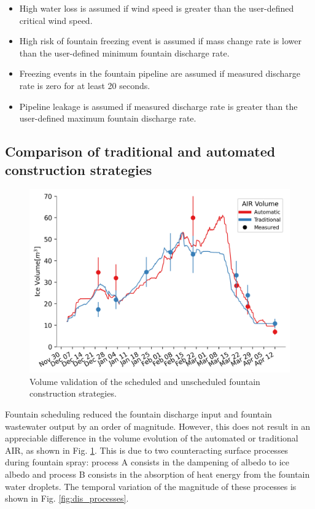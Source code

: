 \begin{itemize}

\item High water loss is assumed if wind speed is greater than the user-defined critical wind speed.

\item High risk of fountain freezing event is assumed if mass change rate is lower than the user-defined minimum fountain discharge rate. 

\item Freezing events in the fountain pipeline are assumed if measured discharge rate is zero for at least 20
  seconds. 

\item Pipeline leakage is assumed if measured discharge rate is greater than the user-defined maximum fountain discharge rate.

\end{itemize}

\subsection{Comparison of traditional and automated construction strategies}

\begin{figure}[htb] \includegraphics[width=\textwidth] {figs/CH_validation.png} \caption{Volume validation of the
scheduled and unscheduled fountain construction strategies.} \label{fig:validation} \end{figure}

Fountain scheduling reduced the fountain discharge input and fountain wastewater output by an order of
magnitude. However, this does not result in an appreciable difference in the volume evolution of the automated
or traditional AIR, as shown in Fig. \ref{fig:validation}. This is due to two counteracting surface processes
during fountain spray: process A consists in the dampening of albedo to ice albedo and process B consists in the
absorption of heat energy from the fountain water droplets. The temporal variation of the magnitude of these
processes is shown in Fig. \ref{fig:dis_processes}.

